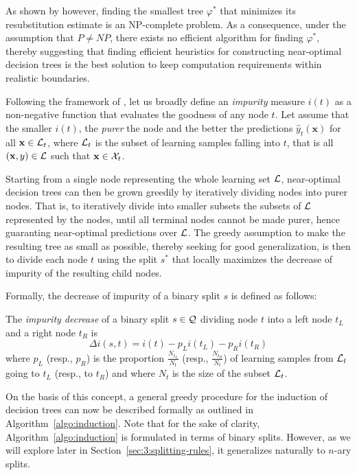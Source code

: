 As shown by \citet{hyafil:1976} however, finding the smallest tree $\varphi^*$
that minimizes its resubstitution estimate is an NP-complete problem. As a
consequence, under the assumption that $P \neq NP$, there exists no efficient
algorithm for finding $\varphi^*$, thereby suggesting that finding efficient heuristics
for constructing near-optimal decision trees is the best solution to keep computation
requirements within realistic boundaries.

Following the framework of \citet{breiman:1984}, let us broadly define an \textit{impurity} measure $i(t)$ as a
non-negative function that evaluates the goodness of any node $t$. Let assume that
the smaller $i(t)$, the \textit{purer} the node and the better the predictions
$\widehat{y}_t(\mathbf{x})$ for all $\mathbf{x} \in {\cal L}_t$, where ${\cal
L}_t$ is the subset of learning samples falling into $t$, that is all
$(\mathbf{x}, y) \in {\cal L}$ such that $\mathbf{x} \in {\cal X}_t$.

Starting from a single node representing the whole learning set  ${\cal L}$,
near-optimal decision trees can then be grown greedily by iteratively dividing
nodes into purer nodes. That is, to iteratively  divide into smaller subsets the
subsets of ${\cal L}$ represented by the nodes, until all terminal nodes cannot
be made purer, hence guaranting near-optimal predictions over ${\cal L}$. The
greedy assumption to make the resulting tree as small as possible, thereby
seeking for good generalization, is then to divide each node $t$ using the
split $s^*$ that locally maximizes the decrease of impurity of the resulting child nodes.

Formally, the decrease of impurity of a binary split $s$ is defined as follows:

\begin{definition}\label{def:impurity-decrease}
The \emph{impurity decrease} of a binary split $s \in {\cal Q}$ dividing node $t$ into
a left node $t_L$ and a right node $t_R$ is
\begin{equation}
\Delta i(s, t) = i(t) - p_L i(t_L) - p_R i(t_R)
\end{equation}
where $p_L$ (resp., $p_R$) is the proportion $\tfrac{N_{t_L}}{N_t}$ (resp., $\tfrac{N_{t_R}}{N_t}$)
of learning samples from ${\cal L}_t$ going to $t_L$ (resp., to $t_R$) and where $N_t$
is the size of the subset ${\cal L}_t$.
\end{definition}

On the basis of this concept, a general greedy procedure for the induction of
decision trees can now be described formally as outlined in
Algorithm~\ref{algo:induction}. Note that for the sake of clarity,
Algorithm~\ref{algo:induction} is formulated in terms of binary splits.
However, as we will explore later in Section~\ref{sec:3:splitting-rules}, it
generalizes naturally to $n$-ary splits.

